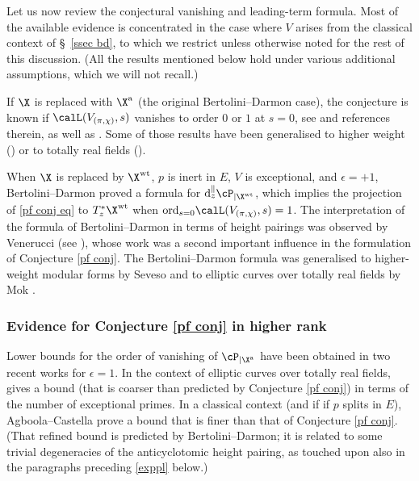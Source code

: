 Let us now review the conjectural vanishing and leading-term formula. Most of the available evidence is concentrated in the case where $V$ arises from the classical context of \S~\ref{ssec bd}, to which we restrict unless otherwise noted for the rest of this discussion. (All the results mentioned below hold under various additional assumptions, which we will not recall.)

 If $\X$ is replaced with $\X^{\rm a}$ (the original Bertolini--Darmon case), the conjecture is  known if $\calL(V_{(\pi, \chi)},s)$ vanishes  to order $0$ or $1$ at $s=0$, see \cite[Theorem 4.2.5]{dd-exc} and references therein, as well as \cite{LP}. Some of those results have been generalised to higher weight (\cite{IoS,Mas}) or to totally real fields (\cite{Hu,BGe,MB}).


  When $\X$ is replaced by $\X^{\rm wt}$, $p$ is inert in $E$, $V$ is exceptional, and $\epsilon =+1$, Bertolini--Darmon \cite{bd-hida} proved a formula  for  ${\rm d}_{z}^{\parallel} \cP_{|\X^{\rm wt}}$, which implies the projection of \eqref{pf conj eq} to $T_{z}^{*}\X^{\rm wt}$ when ${\rm ord}_{s=0}\calL(V_{(\pi, \chi)}, s)=1$. The interpretation of the formula of Bertolini--Darmon in terms of height pairings was observed by Venerucci (see \cite[Theorem 2.1 and Theorem 4.2.2]{ven}), whose work was a second important influence in the formulation of Conjecture \ref{pf conj}.  The Bertolini--Darmon formula was generalised to higher-weight modular forms by Seveso \cite{Sev}  and to elliptic curves over totally real fields by Mok \cite{Mok}.


  \subsubsection{Evidence  for Conjecture \ref{pf conj} in higher rank}
Lower bounds for the order of vanishing of $\cP_{|\X^{\rm a}}$ have been obtained in two recent works for $\epsilon =1$. In the context of elliptic curves over totally real fields, \cite[Theorem 5.5]{BGe} gives a  bound (that is coarser than predicted by Conjecture \ref{pf conj}) in terms of the number of exceptional primes. In a classical context (and if if $p$ splits in $E$),  Agboola--Castella \cite[Corollary 6.5]{Agb-Ca} prove a bound that is finer than that of Conjecture \ref{pf conj}.
 (That refined  bound is predicted by Bertolini--Darmon;  it is related to some trivial  degeneracies of the anticyclotomic height pairing, as touched upon also in the paragraphs preceding \eqref{exppl} below.)



